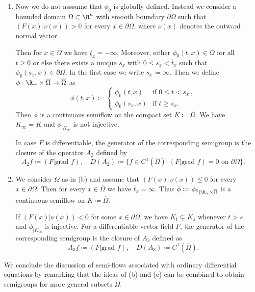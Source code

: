\begin{example}
\begin{enumerate}[\upshape (a), wide, labelindent=.25em]
	\item 
	Now we do not asssume that  $\phi_0$ is globally defined.
	Instead we consider a bounded domain $\Omega \subset \R^n$ with smooth boundary $\partial\Omega$ such that $(F(x)|\nu(x)) > 0$ for every $x \in \partial\Omega$, where $\nu(x)$ denotes the outward normal vector.
	
	Then for $x \in \overline{\Omega}$ we have $\underline{t}_{x} = -\infty$.
	Moreover, either $\phi_{0}(t,x) \in \Omega$ for all $t \geq 0$ or else there exists a unique $s_{x}$ with $0 \leq s_{x} < \overline{t}_{x}$ such that $\phi_{0}(s_{x},x) \in \partial\Omega$.
	In the first case we write $s_{x} \coloneq \infty$.
	Then we define $\phi: \R_{+} \times \overline{\Omega} \to \overline{\Omega}$ as 
	\[\phi(t,x) \coloneq \begin{cases}
		\phi_{0}(t,x) & \text{if } 0 \leq t < s_{x} \,, \\
		\phi_{0}(s_{x},x) & \text{if } t \geq s_{x} .
	\end{cases}\]
	Then $\phi$ is a continuous semiflow on the compact set $K \coloneq \overline{\Omega}$.
	We have $K_{\infty} = K$ and $\phi_{|K_{\infty}}$ is not injective.
	
	In case $F$ is differentiable, the generator of the corresponding semigroup is the closure of the operator $A_{2}$ defined by
	\[
	A_{2}f \coloneq (F|\text{grad }f), \quad D(A_{2}) \coloneq \{f \in C^1(\overline{\Omega}) \colon (F|\text{grad }f) = 0 \text{ on } \partial\Omega\}.	
	\]
	
	\item 
	We consider $\Omega$ as in (b) and assume that $(F(x)|\nu(x)) \leq 0$ for every $x \in \partial\Omega$.
	Then for every $x \in \overline{\Omega}$ we have $\overline{t}_{x} = \infty$.
	Thus $\phi \coloneq {\phi_{0}}_{|\R_{+}\times\overline{\Omega}}$ is a continuous semiflow on $K \coloneq \overline{\Omega}$.
	
	If\/ $(F(x)|\nu(x)) < 0$ for some $x \in \partial\Omega$, we have $K_{t} \subsetneq K_{s}$ whenever $t > s$ and $\phi_{\vert K_{\infty}}$ is injective.
	For a differentiable vector field $F$, the generator of the corresponding semigroup is the closure of\/ $A_{3}$ defined as
	\[
	A_{3}f \coloneq (F|\text{grad }f), \quad D(A_{3}) \coloneq C^1(\overline{\Omega}).
	\]
\end{enumerate}
\end{example}

We conclude the discussion of semi-flows associated with ordinary differential equations by remarking that the ideas of (b) and (c) can be combined to obtain semigroups for more general subsets $\Omega$.

